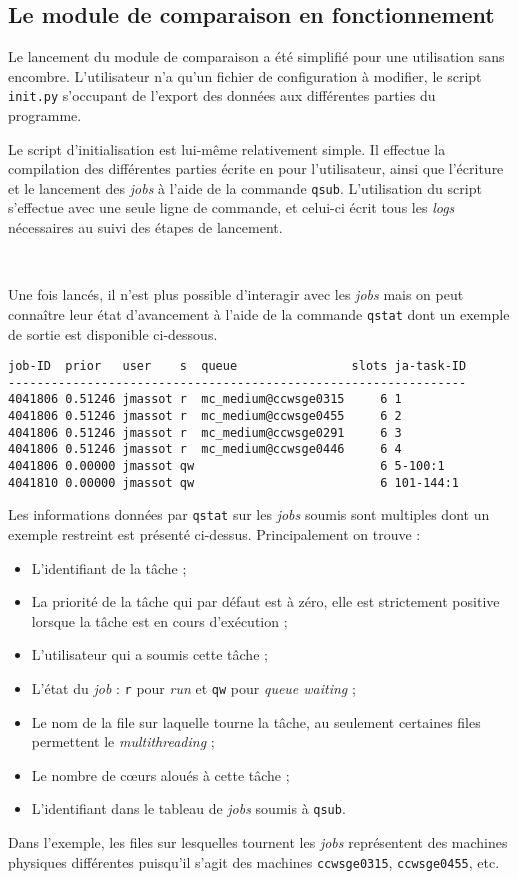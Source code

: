 	\subsection{Le module de comparaison en fonctionnement}

Le lancement du module de comparaison a été simplifié pour une utilisation sans encombre. L'utilisateur n'a qu'un fichier de configuration à modifier, le script \texttt{init.py} s'occupant de l'export des données aux différentes parties du programme.

Le script d'initialisation est lui-même relativement simple. Il effectue la compilation des différentes parties écrite en \Cpp{} pour l'utilisateur, ainsi que l'écriture et le lancement des \emph{jobs} à l'aide de la commande \texttt{qsub}. L'utilisation du script s'effectue avec une seule ligne de commande, et celui-ci écrit tous les \emph{logs} nécessaires au suivi des étapes de lancement.

\

Une fois lancés, il n'est plus possible d'interagir avec les \emph{jobs} mais on peut connaître leur état d'avancement à l'aide de la commande \texttt{qstat} dont un exemple de sortie est disponible ci-dessous.

	\begin{verbatim}
job-ID  prior   user    s  queue                slots ja-task-ID 
----------------------------------------------------------------
4041806 0.51246 jmassot r  mc_medium@ccwsge0315     6 1
4041806 0.51246 jmassot r  mc_medium@ccwsge0455     6 2
4041806 0.51246 jmassot r  mc_medium@ccwsge0291     6 3
4041806 0.51246 jmassot r  mc_medium@ccwsge0446     6 4
4041806 0.00000 jmassot qw                          6 5-100:1
4041810 0.00000 jmassot qw                          6 101-144:1
	\end{verbatim}

Les informations données par \texttt{qstat} sur les \emph{jobs} soumis sont multiples dont un exemple restreint est présenté ci-dessus. Principalement on trouve :
	\begin{itemize}
		\item L'identifiant de la tâche ;
		\item La priorité de la tâche qui par défaut est à zéro, elle est strictement positive lorsque la tâche est en cours d'exécution ;
		\item L'utilisateur qui a soumis cette tâche ;
		\item L'état du \emph{job} : \texttt{r} pour \emph{run} et \texttt{qw} pour \emph{queue waiting} ;
		\item Le nom de la file sur laquelle tourne la tâche, au \CC{} seulement certaines files permettent le \emph{multithreading} ;
		\item Le nombre de c\oe{}urs aloués à cette tâche ;
		\item L'identifiant dans le tableau de \emph{jobs} soumis à \texttt{qsub}.
	\end{itemize}
Dans l'exemple, les files sur lesquelles tournent les \emph{jobs} représentent des machines physiques différentes puisqu'il s'agit des machines \texttt{ccwsge0315}, \texttt{ccwsge0455}, etc.

